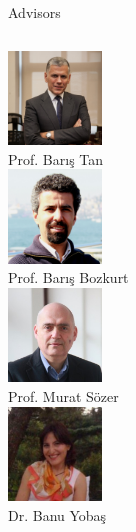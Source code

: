     \begin{frame}{Advisors}
    
      \begin{columns}
				\column{3.333cm}
				  \centering 
					\includegraphics[width=2.5cm]{images/btan.jpg}\\
					Prof. Barış Tan\\
          \vspace{2.5mm}
          \includegraphics[width=2.5cm]{images/bbozkurt.jpg}\\
					Prof. Barış Bozkurt\\
        
          \column{3.333cm}
				  \centering
					\includegraphics[width=2.5cm]{images/msozer.jpg}\\
					Prof. Murat Sözer\\
          \vspace{2.5mm}
          \includegraphics[width=2.5cm]{images/byobas.jpg}\\
					Dr. Banu Yobaş\\
          

\end{columns}
\end{frame}
